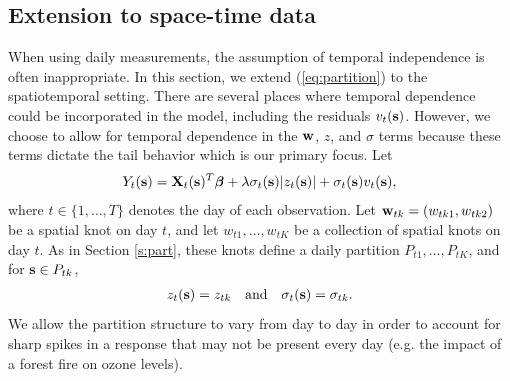 \documentclass[useAMS,usenatbib,referee]{biom}
\begin{document}
\subsection{Extension to space-time data} \label{s:temporal}
When using daily measurements, the assumption of temporal independence is often inappropriate.
In this section, we extend (\ref{eq:partition}) to the spatiotemporal setting.
There are several places where temporal dependence could be incorporated in the model, including the residuals $v_t(\mbox{\bf s})$.
However, we choose to allow for temporal dependence in the $\mbox{\bf w}$, $z$, and $\sigma$ terms because these terms dictate the tail behavior which is our primary focus.
Let
\begin{align} \label{eq:spatiotemp}
  Y_t(\bs) = \bX_t(\bs)^T \bbeta + \lambda \sigma_t(\bs) |z_t(\bs)| + \sigma_t(\bs) v_t(\bs),
\end{align}
where $t \in \{1, \ldots, T\}$ denotes the day of each observation.
Let \hbox{$\mbox{\bf w}_{tk} = (w_{tk1}, w_{tk2})$} be a spatial knot on day $t$, and let $w_{t1}, \ldots, w_{tK}$ be a collection of spatial knots on day $t$.
As in Section \ref{s:part}, these knots define a daily partition $P_{t1}, \ldots, P_{tK}$, and for $\mbox{\bf s} \in P_{tk}$,
\begin{align}
  z_t(\mbox{\bf s}) = z_{tk}\quad \text{and} \quad \sigma_{t}(\mbox{\bf s}) = \sigma_{tk}.
\end{align}
We allow the partition structure to vary from day to day in order to account for sharp spikes in a response that may not be present every day (e.g. the impact of a forest fire on ozone levels).
\end{document}
